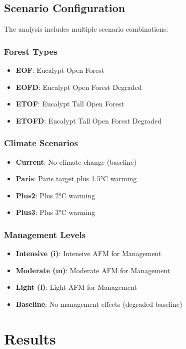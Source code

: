 \documentclass[11pt,a4paper]{article}
\begin{document}
\subsection{Scenario Configuration}
The analysis includes multiple scenario combinations:

\subsubsection{Forest Types}
\begin{itemize}
    \item \textbf{EOF}: Eucalypt Open Forest
    \item \textbf{EOFD}: Eucalypt Open Forest Degraded
    \item \textbf{ETOF}: Eucalypt Tall Open Forest
    \item \textbf{ETOFD}: Eucalypt Tall Open Forest Degraded
\end{itemize}

\subsubsection{Climate Scenarios}
\begin{itemize}
    \item \textbf{Current}: No climate change (baseline)
    \item \textbf{Paris}: Paris target plus 1.5°C warming
    \item \textbf{Plus2}: Plus 2°C warming
    \item \textbf{Plus3}: Plus 3°C warming
\end{itemize}

\subsubsection{Management Levels}
\begin{itemize}
    \item \textbf{Intensive (i)}: Intensive AFM for Management
    \item \textbf{Moderate (m)}: Moderate AFM for Management
    \item \textbf{Light (l)}: Light AFM for Management
    \item \textbf{Baseline}: No management effects (degraded baseline)
\end{itemize}

\section{Results}
\end{document}
